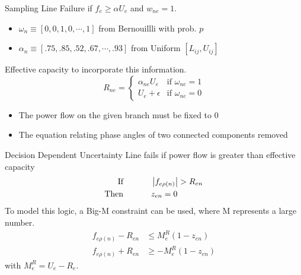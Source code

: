 \begin{frame}{Sampling}
Line Failure if $f_e \ge \alpha U_e$ and $w_{ne} =1$.  
\begin{itemize}
\item $\omega_n \equiv\left[ 0, 0, 1, 0, \cdots, 1\right]$	from Bernouillli with prob. $p$
\item $\alpha_n \equiv\left[ .75, .85, .52, .67, \cdots, .93\right]$	from Uniform $\left[ L_{ij}, U_{ij} \right]$
\end{itemize}

Effective capacity to incorporate this information.    
\begin{equation*}
 R_{ne} = 
 \left\{ 
	\begin{array}{lr}
				\alpha_{ne} U_e & \mbox{if } \omega_{ne}=1\\
			  U_e + \epsilon & \mbox{if } \omega_{ne}=0
	\end{array}
 \right. 
\end{equation*}
\pause
{}
\begin{itemize}
\item The power flow on the given branch must be fixed to 0
\item The equation relating phase angles of two connected components removed
\end{itemize}
\EBR

\end{frame}



\begin{frame}{Decision Dependent Uncertainty}
Line fails if power flow is greater than effective capacity
\begin{align*}
\mbox{If }
		\hspace{30px}&\left| f_{e\rho(n)} \right| > R_{en}  \\
\mbox{Then }
		\hspace{30px}&z_{en} = 0
\end{align*}
\pause
To model this logic, a Big-M constraint can be used, where M represents a large number.
\begin{align*}
	f_{e\rho(n)} - R_{en} &\le M^R_e (1-z_{en})	\\
	f_{e\rho(n)} + R_{en} &\ge - M^R_e (1-z_{en})	
\end{align*}
with $M^R_e = U_e - R_e$. \\

\end{frame}

